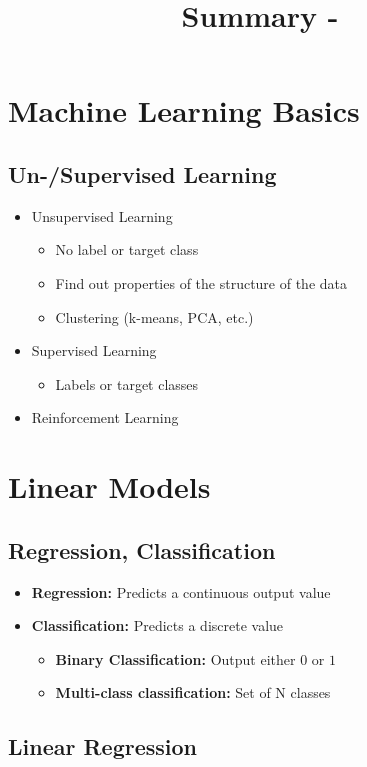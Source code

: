 \documentclass[10pt,a4paper]{article}
\title{Summary - \lecture}
\author{}
\date{}
\begin{document}
\tableofcontents
\pagebreak

\section{Machine Learning Basics}
\subsection{Un-/Supervised Learning}
\begin{itemize}
	\item Unsupervised Learning
	\begin{itemize}
		\item No label or target class
		\item Find out properties of the structure of the data
		\item Clustering (k-means, PCA, etc.)
	\end{itemize}
	\item Supervised Learning
	\begin{itemize}
		\item Labels or target classes
	\end{itemize}
	\item Reinforcement Learning
\end{itemize}

\pagebreak
\section{Linear Models}
\subsection{Regression, Classification}
\begin{itemize}
	\item \textbf{Regression:} Predicts a continuous output value
	\item \textbf{Classification:} Predicts a discrete value
	\begin{itemize}
		\item \textbf{Binary Classification:} Output either $0$ or $1$
		\item \textbf{Multi-class classification:} Set of N classes
	\end{itemize}
\end{itemize}

\subsection{Linear Regression}
\end{document}

